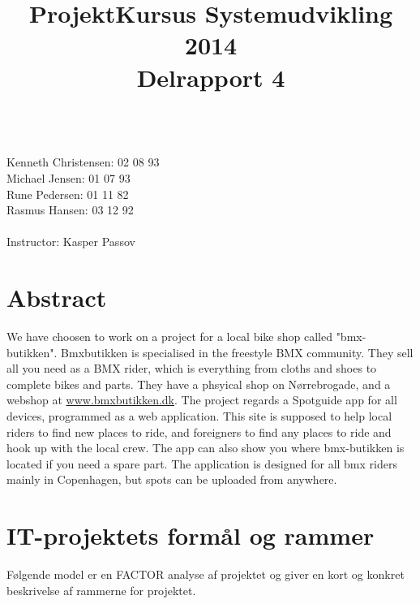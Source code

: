 \documentclass[12pt]{article}
\title{ProjektKursus Systemudvikling 2014\\Delrapport 4}
\author{}
\begin{document}
\maketitle
{}\\
Kenneth Christensen: 02 08 93\\Michael Jensen: 01 07 93\\Rune Pedersen: 01 11 82\\Rasmus Hansen: 03 12 92
\\\\
Instructor: Kasper Passov

\pagebreak
\tableofcontents
\pagebreak
\section{Abstract}
We have choosen to work on a project for a local bike shop called "bmx-butikken". Bmxbutikken is specialised in the freestyle BMX community. They sell all you need as a BMX rider, which is everything from cloths and shoes to complete bikes and parts. They have a phsyical shop on Nørrebrogade, and a webshop at \url{www.bmxbutikken.dk}. The project regards a Spotguide app for all devices, programmed as a web application. This site is supposed to help local riders to find new places to ride, and foreigners to find any places to ride and hook up with the local crew. The app can also show you where bmx-butikken is located if you need a spare part. The application is designed for all bmx riders mainly in Copenhagen, but spots can be uploaded from anywhere.
\section{IT-projektets formål og rammer}
Følgende model er en FACTOR analyse af projektet og giver en kort og konkret beskrivelse af rammerne for projektet.\\
\end{document}
